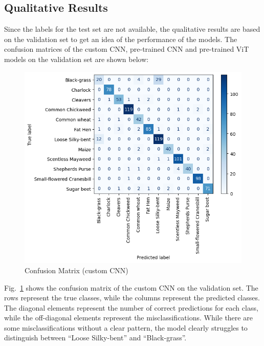 \subsection{Qualitative Results}

Since the labels for the test set are not available, the qualitative results are based on the validation set to get an idea of the performance of the models. The confusion matrices of the custom CNN, pre-trained CNN and pre-trained ViT models on the validation set are shown below:

\begin{figure}[htbp]
    \centerline{\includegraphics[width=0.9\linewidth]{../../resources/custom_cnn/confusion.png}}
    \caption{Confusion Matrix (custom CNN)}
    \label{fig:confusion-matrix-custom-cnn}
\end{figure}

Fig.~\ref{fig:confusion-matrix-custom-cnn} shows the confusion matrix of the custom CNN on the validation set. The rows represent the true classes, while the columns represent the predicted classes. The diagonal elements represent the number of correct predictions for each class, while the off-diagonal elements represent the misclassifications. While there are some misclassifications without a clear pattern, the model clearly struggles to distinguish between ``Loose Silky-bent'' and ``Black-grass''.

